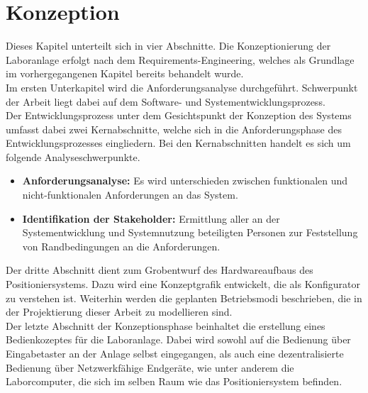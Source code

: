 \documentclass[../../Bachelorarbeit.tex]{subfiles}
\begin{document}
\section{Konzeption}
Dieses Kapitel unterteilt sich in vier Abschnitte. Die Konzeptionierung der Laboranlage erfolgt nach dem Requirements-Engineering, welches als Grundlage im vorhergegangenen Kapitel bereits behandelt wurde.\\
Im ersten Unterkapitel wird die Anforderungsanalyse durchgeführt. Schwerpunkt der Arbeit liegt dabei auf dem Software- und Systementwicklungsprozess.\\
Der Entwicklungsprozess unter dem Gesichtspunkt der Konzeption des Systems umfasst dabei zwei Kernabschnitte, welche sich in die Anforderungsphase des Entwicklungsprozesses eingliedern. Bei den Kernabschnitten handelt es sich um folgende Analyseschwerpunkte.\\
\begin{itemize}
    \item \textbf{Anforderungsanalyse:} Es wird unterschieden zwischen funktionalen und nicht-funktionalen Anforderungen an das System.
    \item \textbf{Identifikation der Stakeholder:} Ermittlung aller an der Systementwicklung und Systemnutzung beteiligten Personen zur Feststellung von Randbedingungen an die Anforderungen.
\end{itemize}

Der dritte Abschnitt dient zum Grobentwurf des Hardwareaufbaus des Positioniersystems. Dazu wird eine Konzeptgrafik entwickelt, die als Konfigurator zu verstehen ist. Weiterhin werden die geplanten Betriebsmodi beschrieben, die in der Projektierung dieser Arbeit zu modellieren sind.\\
Der letzte Abschnitt der Konzeptionsphase beinhaltet die erstellung eines Bedienkozeptes für die Laboranlage. Dabei wird sowohl auf die Bedienung über Eingabetaster an der Anlage selbst eingegangen, als auch eine dezentralisierte Bedienung über Netzwerkfähige Endgeräte, wie unter anderem die Laborcomputer, die sich im selben Raum wie das Positioniersystem befinden.
\end{document}
